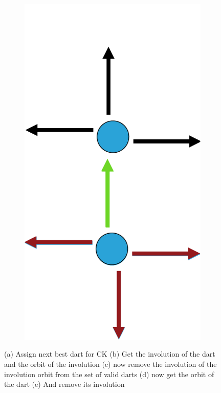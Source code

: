 \documentclass[12pt]{article}
\begin{document}
\begin{figure}[tb]
\begin{subfigure}[b]{0.15\textwidth}
      \includegraphics[width=\textwidth]{img/5}
      \caption{}\label{fig:contraction_kernel_greedy5}
  \end{subfigure}

  \caption{(a) Assign next best dart for CK (b) Get the involution of the dart and the orbit of the involution (c) now remove the involution of the involution orbit from the set of valid darts (d) now get the orbit of the dart (e) And remove its involution}
  \label{fig:contraction_kernel_greedy}
\end{figure}
\end{document}
